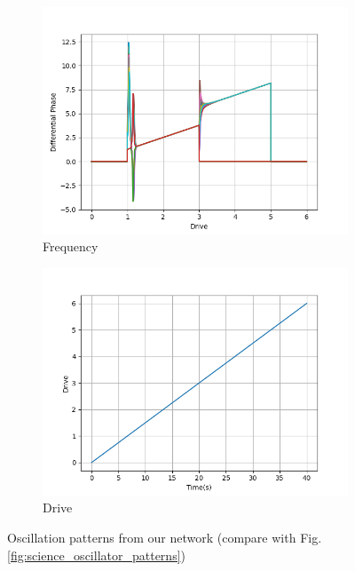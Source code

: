 \documentclass{cmc}
\begin{document}
\begin{figure}[H]
\begin{subfigure}[b]{0.5\linewidth}
    \includegraphics[width=1\linewidth]{figures/Differential_phase.png} 
    \caption{Frequency} 
    \label{fig:oscillation:c} 
  \end{subfigure}%
  \begin{subfigure}[b]{0.45\linewidth}
    \centering
    \includegraphics[width=1\linewidth]{figures/Drive.png} 
    \caption{Drive} 
    \label{fig:oscillation:d} 
  \end{subfigure} 
  \caption{Oscillation patterns from our network (compare with Fig. \ref{fig:science_oscillator_patterns})}
  \label{fig:oscillation} 
\end{figure}
\end{document}

